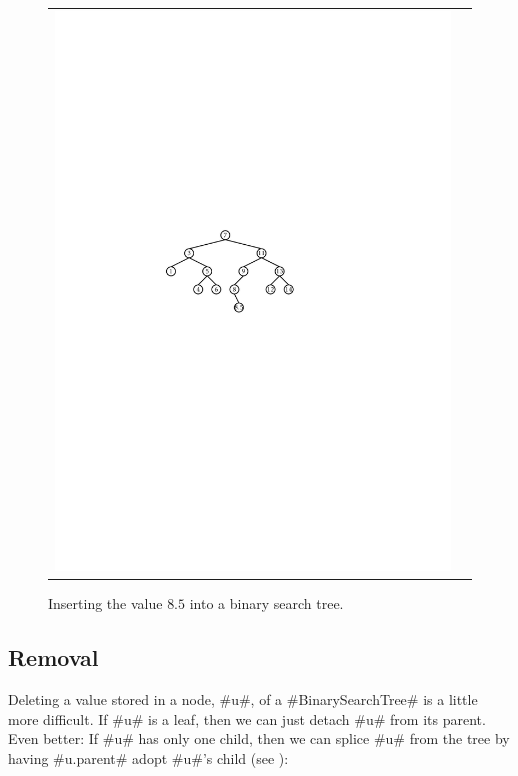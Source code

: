 \begin{figure}
\begin{center}
\begin{tabular}{cc}
    \includegraphics[width=\HalfScaleIfNeeded]{figs/bst-example-5} 
    \end{tabular}
  \end{center}
  \caption{Inserting the value $8.5$ into a binary search tree.}
\end{figure}


\subsection{Removal}

Deleting a value stored in a node, #u#, of a #BinarySearchTree# is a
little more difficult.  If #u# is a leaf, then we can just detach #u#
from its parent.  Even better: If #u# has only one child, then we can
splice #u# from the tree by having #u.parent# adopt #u#'s child (see
):

